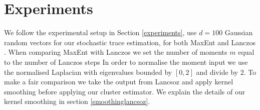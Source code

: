 \documentclass[letterpaper]{article} %
\begin{document}
\section{Experiments}
\label{experimentsgraph}
We follow the experimental setup in Section \ref{experiments}, use $d=100$ Gaussian random vectors for our stochastic trace estimation, for both MaxEnt and Lanczos \citep{ubaru2017fast}. 
When comparing MaxEnt with Lanczos we set the number of moments $m$ equal to the number of Lanczos steps%
In order to normalise the moment input we use the normalised Laplacian with eigenvalues bounded by $[0,2]$ and divide by $2$. 
To make a fair comparison we take the output from Lancsoz \citep{ubaru2017fast} and apply kernel smoothing \citep{lin2016approximating} before applying our cluster estimator. We explain the details of our kernel smoothing in section \ref{smoothinglancsoz}.

	
\end{document}
